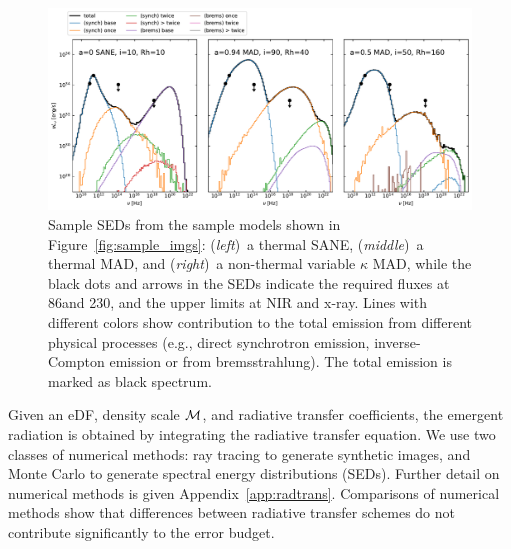 

\begin{figure}
  \centering
  \includegraphics[width=\textwidth,trim=0 12 0 0]{figures/sample_sed.pdf}
  \caption{Sample SEDs from the sample models shown in
    Figure~\ref{fig:sample_imgs}:
    (\emph{left})~a thermal SANE,
    (\emph{middle})~a thermal MAD, and
    (\emph{right})~a non-thermal variable $\kappa$ MAD,
    while the black dots and arrows in the SEDs indicate the required
    fluxes at 86\GHz and 230\GHz, and the upper limits at NIR and x-ray.
    Lines with different colors show contribution to the total
    emission from different physical processes (e.g., direct
    synchrotron emission, inverse-Compton emission or from 
    bremsstrahlung).
    The total emission is marked as black spectrum.
      }
  \label{fig:sample_SEDs}
\end{figure}

Given an eDF, density scale $\mathcal{M}$, and radiative transfer coefficients, the emergent radiation is obtained by integrating the radiative transfer equation.
We use two classes of numerical methods: ray tracing to generate synthetic images, and Monte Carlo to generate spectral energy distributions (SEDs).
Further detail on numerical methods is given Appendix~\ref{app:radtrans}.
Comparisons of numerical methods \citep{2020ApJ...897..148G, Prather_et_al_2022} show that differences between radiative transfer schemes do not contribute significantly to the error budget.

